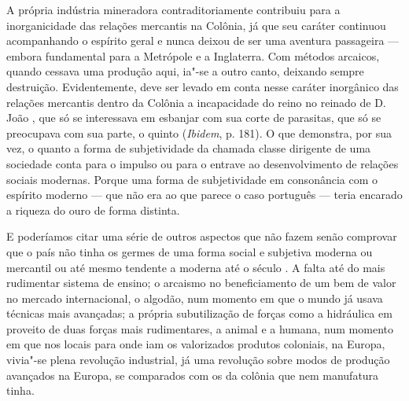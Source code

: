 A própria indústria mineradora contraditoriamente contribuiu para a
inorganicidade das relações mercantis na Colônia, já que seu caráter
continuou acompanhando o espírito geral e nunca deixou de ser uma
aventura passageira --- embora fundamental para a Metrópole e a
Inglaterra. Com métodos arcaicos, quando cessava uma produção aqui,
ia"-se a outro canto, deixando sempre destruição. Evidentemente, deve ser
levado em conta nesse caráter inorgânico das relações mercantis dentro
da Colônia a incapacidade do reino no reinado de D. João , que só se
interessava em esbanjar com sua corte de parasitas, que só se preocupava
com sua parte, o quinto (\emph{Ibidem}, p. 181). O que demonstra, por
sua vez, o quanto a forma de subjetividade da chamada classe dirigente
de uma sociedade conta para o impulso ou para o entrave ao
desenvolvimento de relações sociais modernas. Porque uma forma de
subjetividade em consonância com o espírito moderno --- que não era ao
que parece o caso português --- teria encarado a riqueza do ouro de forma
distinta.

E poderíamos citar uma série de outros aspectos que não fazem senão
comprovar que o país não tinha os germes de uma forma social e subjetiva
moderna ou mercantil ou até mesmo tendente a moderna até o século . A
falta até do mais rudimentar sistema de ensino; o arcaismo no
beneficiamento de um bem de valor no mercado internacional, o algodão,
num momento em que o mundo já usava técnicas mais avançadas; a própria
subutilização de forças como a hidráulica em proveito de duas forças
mais rudimentares, a animal e a humana, num momento em que nos locais
para onde iam os valorizados produtos coloniais, na Europa, vivia"-se
plena revolução industrial, já uma revolução sobre modos de produção
avançados na Europa, se comparados com os da colônia que nem manufatura
tinha.

